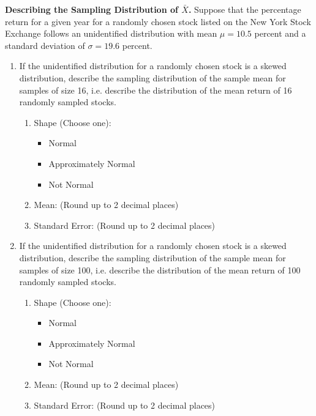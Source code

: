 \item \textbf{Describing the Sampling Distribution of $\bar{X}$.}  Suppose that the percentage return for a given year for a randomly chosen stock listed on the New York Stock Exchange follows an unidentified distribution with mean $\mu=10.5$ percent and a standard deviation of $\sigma=19.6$ percent.
	\begin{enumerate}
	\item If the unidentified distribution for a randomly chosen stock is a skewed distribution, describe the sampling distribution of the sample mean for samples of size 16, i.e. describe the distribution of the mean return of 16 randomly sampled stocks. 
	\begin{enumerate}
		\item Shape (Choose one):
		\begin{itemize}
			\item Normal 
			\item Approximately Normal
			\item Not Normal
		\end{itemize}
		\item Mean: \underline{\hspace{2cm}}  (Round up to 2 decimal places)
		\item Standard Error: \underline{\hspace{2cm}}  (Round up to 2 decimal places)\\
	\end{enumerate}
	\item If the unidentified distribution for a randomly chosen stock is a skewed distribution, describe the sampling distribution of the sample mean for samples of size 100, i.e. describe the distribution of the mean return of 100 randomly sampled  stocks. 
	\begin{enumerate}
		\item Shape (Choose one):
		\begin{itemize}
			\item Normal 
			\item Approximately Normal
			\item Not Normal
		\end{itemize}
		\item Mean: \underline{\hspace{2cm}}   (Round up to 2 decimal places)
		\item Standard Error: \underline{\hspace{2cm}}    (Round up to 2 decimal places)\\

\end{enumerate}
\end{enumerate}
